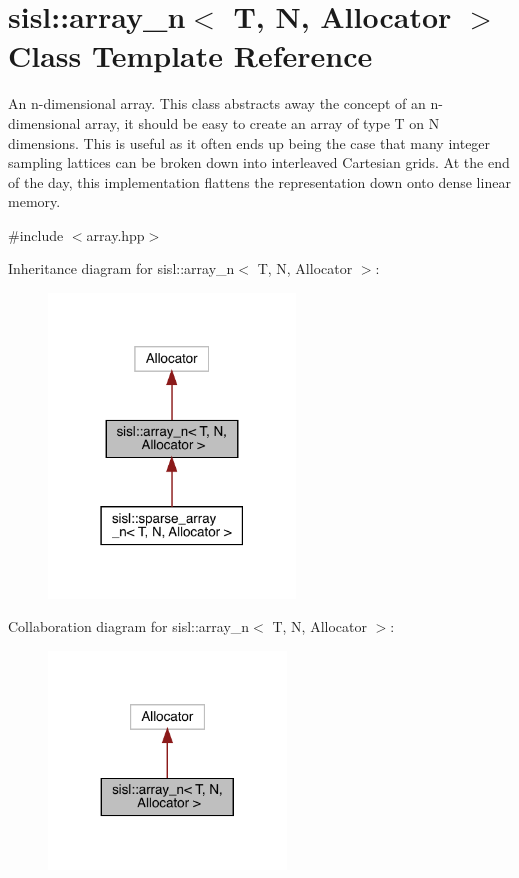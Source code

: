 \hypertarget{classsisl_1_1array__n}{}\section{sisl\+:\+:array\+\_\+n$<$ T, N, Allocator $>$ Class Template Reference}
\label{classsisl_1_1array__n}


An n-\/dimensional array. This class abstracts away the concept of an n-\/dimensional array, it should be easy to create an array of type T on N dimensions. This is useful as it often ends up being the case that many integer sampling lattices can be broken down into interleaved Cartesian grids. At the end of the day, this implementation flattens the representation down onto dense linear memory.  




{\ttfamily \#include $<$array.\+hpp$>$}



Inheritance diagram for sisl\+:\+:array\+\_\+n$<$ T, N, Allocator $>$\+:\nopagebreak
\begin{figure}[H]
\begin{center}
\leavevmode
\includegraphics[width=186pt]{classsisl_1_1array__n__inherit__graph}
\end{center}
\end{figure}


Collaboration diagram for sisl\+:\+:array\+\_\+n$<$ T, N, Allocator $>$\+:\nopagebreak
\begin{figure}[H]
\begin{center}
\leavevmode
\includegraphics[width=179pt]{classsisl_1_1array__n__coll__graph}
\end{center}
\end{figure}
